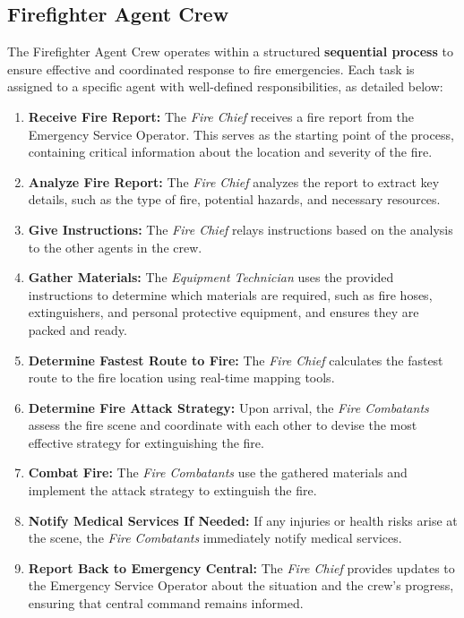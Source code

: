 \subsection{Firefighter Agent Crew}

The Firefighter Agent Crew operates within a structured \textbf{sequential process} to ensure effective and coordinated response to fire emergencies. Each task is assigned to a specific agent with well-defined responsibilities, as detailed below:

\begin{enumerate}
    \item \textbf{Receive Fire Report:} The \textit{Fire Chief} receives a fire report from the Emergency Service Operator. This serves as the starting point of the process, containing critical information about the location and severity of the fire.
    \item \textbf{Analyze Fire Report:} The \textit{Fire Chief} analyzes the report to extract key details, such as the type of fire, potential hazards, and necessary resources.
    \item \textbf{Give Instructions:} The \textit{Fire Chief} relays instructions based on the analysis to the other agents in the crew.
    \item \textbf{Gather Materials:} The \textit{Equipment Technician} uses the provided instructions to determine which materials are required, such as fire hoses, extinguishers, and personal protective equipment, and ensures they are packed and ready.
    \item \textbf{Determine Fastest Route to Fire:} The \textit{Fire Chief} calculates the fastest route to the fire location using real-time mapping tools.
    \item \textbf{Determine Fire Attack Strategy:} Upon arrival, the \textit{Fire Combatants} assess the fire scene and coordinate with each other to devise the most effective strategy for extinguishing the fire.
    \item \textbf{Combat Fire:} The \textit{Fire Combatants} use the gathered materials and implement the attack strategy to extinguish the fire.
    \item \textbf{Notify Medical Services If Needed:} If any injuries or health risks arise at the scene, the \textit{Fire Combatants} immediately notify medical services.
    \item \textbf{Report Back to Emergency Central:} The \textit{Fire Chief} provides updates to the Emergency Service Operator about the situation and the crew’s progress, ensuring that central command remains informed.
\end{enumerate}

